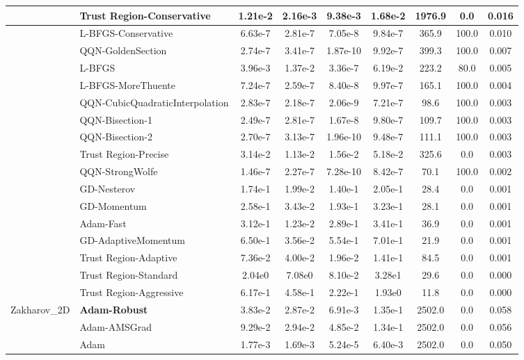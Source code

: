 \documentclass[10pt]{article}
\begin{document}
\begin{longtable}{|l|l|c|c|c|c|c|c|c|}
\hline
 & Trust Region-Conservative & 1.21e-2 & 2.16e-3 & 9.38e-3 & 1.68e-2 & 1976.9 & 0.0 & 0.016 \\
\hline
 & L-BFGS-Conservative & 6.63e-7 & 2.81e-7 & 7.05e-8 & 9.84e-7 & 365.9 & 100.0 & 0.010 \\
\hline
 & QQN-GoldenSection & 2.74e-7 & 3.41e-7 & 1.87e-10 & 9.92e-7 & 399.3 & 100.0 & 0.007 \\
\hline
 & L-BFGS & 3.96e-3 & 1.37e-2 & 3.36e-7 & 6.19e-2 & 223.2 & 80.0 & 0.005 \\
\hline
 & L-BFGS-MoreThuente & 7.24e-7 & 2.59e-7 & 8.40e-8 & 9.97e-7 & 165.1 & 100.0 & 0.004 \\
\hline
 & QQN-CubicQuadraticInterpolation & 2.83e-7 & 2.18e-7 & 2.06e-9 & 7.21e-7 & 98.6 & 100.0 & 0.003 \\
\hline
 & QQN-Bisection-1 & 2.49e-7 & 2.81e-7 & 1.67e-8 & 9.80e-7 & 109.7 & 100.0 & 0.003 \\
\hline
 & QQN-Bisection-2 & 2.70e-7 & 3.13e-7 & 1.96e-10 & 9.48e-7 & 111.1 & 100.0 & 0.003 \\
\hline
 & Trust Region-Precise & 3.14e-2 & 1.13e-2 & 1.56e-2 & 5.18e-2 & 325.6 & 0.0 & 0.003 \\
\hline
 & QQN-StrongWolfe & 1.46e-7 & 2.27e-7 & 7.28e-10 & 8.42e-7 & 70.1 & 100.0 & 0.002 \\
\hline
 & GD-Nesterov & 1.74e-1 & 1.99e-2 & 1.40e-1 & 2.05e-1 & 28.4 & 0.0 & 0.001 \\
\hline
 & GD-Momentum & 2.58e-1 & 3.43e-2 & 1.93e-1 & 3.23e-1 & 28.1 & 0.0 & 0.001 \\
\hline
 & Adam-Fast & 3.12e-1 & 1.23e-2 & 2.89e-1 & 3.41e-1 & 36.9 & 0.0 & 0.001 \\
\hline
 & GD-AdaptiveMomentum & 6.50e-1 & 3.56e-2 & 5.54e-1 & 7.01e-1 & 21.9 & 0.0 & 0.001 \\
\hline
 & Trust Region-Adaptive & 7.36e-2 & 4.00e-2 & 1.96e-2 & 1.41e-1 & 84.5 & 0.0 & 0.001 \\
\hline
 & Trust Region-Standard & 2.04e0 & 7.08e0 & 8.10e-2 & 3.28e1 & 29.6 & 0.0 & 0.000 \\
\hline
 & Trust Region-Aggressive & 6.17e-1 & 4.58e-1 & 2.22e-1 & 1.93e0 & 11.8 & 0.0 & 0.000 \\
Zakharov\_2D & \textbf{Adam-Robust} & 3.83e-2 & 2.87e-2 & 6.91e-3 & 1.35e-1 & 2502.0 & 0.0 & 0.058 \\
\hline
 & Adam-AMSGrad & 9.29e-2 & 2.94e-2 & 4.85e-2 & 1.34e-1 & 2502.0 & 0.0 & 0.056 \\
\hline
 & Adam & 1.77e-3 & 1.69e-3 & 5.24e-5 & 6.40e-3 & 2502.0 & 0.0 & 0.050 \\

\end{longtable}
\end{document}
